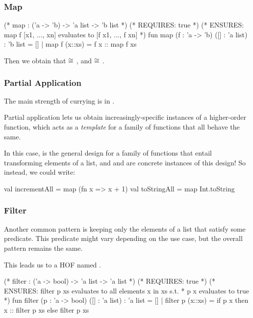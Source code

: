 \documentclass[aspectratio=169]{beamer}
\begin{document}
\begin{frame}[fragile]
  \frametitle{Map}

  \begin{codeblock}
    (* map : ('a -> 'b) -> 'a list -> 'b list *)
    (* REQUIRES: true *)
    (* ENSURES: map f [x1, ..., xn] evaluates to [f x1, ..., f xn] *)
    fun map (f : 'a -> 'b) ([] : 'a list) : 'b list = []
      | map f (x::xs) = f x :: map f xs
  \end{codeblock}

  Then we obtain that  $\cong$ , 
  and  $\cong$ .
\end{frame}

\begin{frame}[fragile]
  \frametitle{Partial Application}

  The main strength of currying is in .


  Partial application lets us obtain increasingly-specific instances of a higher-order
  function, which acts as a \textit{template} for a family of functions that all behave
  the same.

  In this case,  is the general design for a family of functions that entail
  transforming elements of a list, and  and  are
  concrete instances of this design! So instead, we could write: 

  \begin{codeblock}
    val incrementAll = map (fn x => x + 1)
    val toStringAll = map Int.toString 
  \end{codeblock}
\end{frame}

\begin{frame}[fragile]
  \frametitle{Filter}

  Another common pattern is keeping only the elements of a list that satisfy
  some predicate. This predicate might vary depending on the use case, but 
  the overall pattern remains the same.

  This leads us to a HOF named .

  \begin{codeblock}
    (* filter : ('a -> bool) -> 'a list -> 'a list *)
    (* REQUIRES: true *)
    (* ENSURES: filter p xs evaluates to all elements x in xs s.t.
     * p x evaluates to true *)
    fun filter (p : 'a -> bool) ([] : 'a list) : 'a list = []
      | filter p (x::xs) =
          if p x then
            x :: filter p xs
          else
            filter p xs
  \end{codeblock}
\end{frame}
\end{document}
